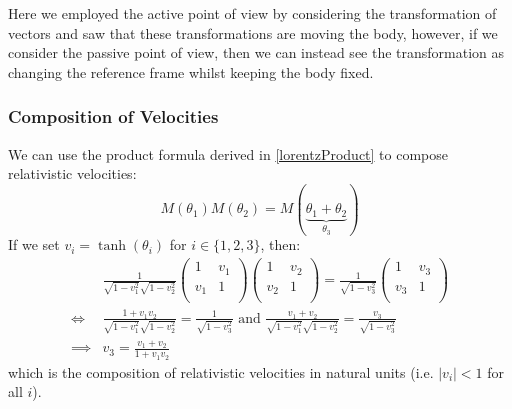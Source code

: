\documentclass[../main.tex]{subfiles}
\begin{document}
Here we employed the active point of view by considering the transformation of vectors and saw that these transformations are moving the body, however, if we consider the passive point of view, then we can instead see the transformation as changing the reference frame whilst keeping the body fixed.
\subsubsection{Composition of Velocities}
We can use the product formula derived in \cref{lorentzProduct} to compose relativistic velocities:
\[
  M(\theta_1)M(\theta_2) = M(\underbrace{\theta_1 + \theta_2}_{\theta_3})
\]
If we set $v_i = \tanh(\theta_i)$ for $i \in \{1, 2, 3\}$, then:
\begin{align*}
  &\frac{1}{\sqrt{1 - v^{2}_{1}}\sqrt{1 - v^{2}_{2}}}
  \begin{pmatrix}
  1 & v_1 \\
  v_1 & 1 \\
  \end{pmatrix}
  \begin{pmatrix}
  1 & v_2 \\
  v_2 & 1 \\
  \end{pmatrix} =
  \frac{1}{\sqrt{1 - v^{2}_{3}}}
  \begin{pmatrix}
  1 & v_3 \\
  v_3 & 1 \\
  \end{pmatrix} \\
  \iff& \frac{1 + v_1 v_2}{\sqrt{1 - v^{2}_{1}}\sqrt{1 - v^{2}_{2}}} = \frac{1}{\sqrt{1 - v^{2}_{3}}} \text{ and }
  \frac{v_1 + v_2}{\sqrt{1 - v^{2}_{1}}\sqrt{1 - v^{2}_{2}}} = \frac{v_3}{\sqrt{1 - v^{2}_{3}}} \\
  \implies& v_3 = \frac{v_1 + v_2}{1 + v_1v_2}
\end{align*}
which is the composition of relativistic velocities in natural units (i.e. $|v_i| < 1$ for all $i$).
\end{document}
